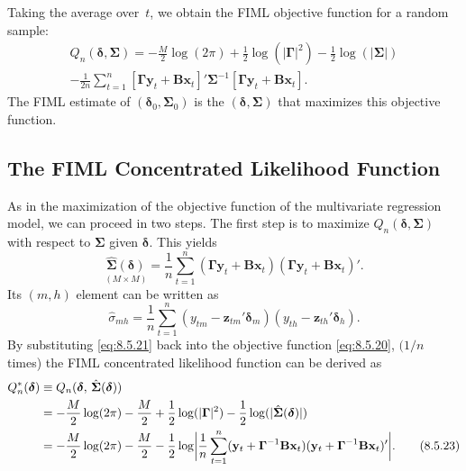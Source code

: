 Taking the average over~$t$, we obtain the FIML objective function for a random
sample:
\begin{multline}
  Q_n(\boldsymbol{\delta}, \boldsymbol{\Sigma})
  = -\frac{M}{2}\log(2\pi)
    + \frac{1}{2}\log(|\boldsymbol{\Gamma}|^2)
    - \frac{1}{2}\log(|\boldsymbol{\Sigma}|) \\
    - \frac{1}{2n}\sum_{t=1}^{n}
      [\boldsymbol{\Gamma}\mathbf{y}_t + \mathbf{B}\mathbf{x}_t]'
      \boldsymbol{\Sigma}^{-1}
      [\boldsymbol{\Gamma}\mathbf{y}_t + \mathbf{B}\mathbf{x}_t].
  \label{eq:8.5.20} \tag{8.5.20}
\end{multline}
The FIML estimate of $(\boldsymbol{\delta}_0, \boldsymbol{\Sigma}_0)$ is the $(\boldsymbol{\delta}, \boldsymbol{\Sigma})$ that maximizes this objective function.

\subsection*{The FIML Concentrated Likelihood Function}

As in the maximization of the objective function of the multivariate regression
model, we can proceed in two steps. The first step is to maximize
$Q_n(\boldsymbol{\delta}, \boldsymbol{\Sigma})$ with
respect to $\boldsymbol{\Sigma}$ given $\boldsymbol{\delta}$. This yields
\begin{equation}
  \underset{(M \times M)}{\hat{\boldsymbol{\Sigma}}(\boldsymbol{\delta})}
  = \frac{1}{n}\sum_{t=1}^{n}
    (\boldsymbol{\Gamma}\mathbf{y}_t + \mathbf{B}\mathbf{x}_t)
    (\boldsymbol{\Gamma}\mathbf{y}_t + \mathbf{B}\mathbf{x}_t)'.
  \label{eq:8.5.21} \tag{8.5.21}
\end{equation}
Its $(m, h)$ element can be written as
\begin{equation}
  \hat{\sigma}_{mh}
  = \frac{1}{n}\sum_{t=1}^{n}
    (y_{tm} - \mathbf{z}_{tm}'\boldsymbol{\delta}_m)
    (y_{th} - \mathbf{z}_{th}'\boldsymbol{\delta}_h).
  \label{eq:8.5.22} \tag{8.5.22}
\end{equation}
By substituting \eqref{eq:8.5.21} back into the objective function \eqref{eq:8.5.20},
$(1/n$ times) the
FIML concentrated likelihood function can be derived as
\begin{align}
  Q_n^*(\boldsymbol{\delta})
  &\equiv Q_n(\boldsymbol{\delta},\, \hat{\boldsymbol{\Sigma}}(\boldsymbol{\delta})) \notag \\
  &= -\frac{M}{2}\log(2\pi)
     - \frac{M}{2}
     + \frac{1}{2}\log(|\boldsymbol{\Gamma}|^2)
     - \frac{1}{2}\log(|\hat{\boldsymbol{\Sigma}}(\boldsymbol{\delta})|) \notag \\
  &= -\frac{M}{2}\log(2\pi)
     - \frac{M}{2}
     - \frac{1}{2}\log\biggl|\frac{1}{n}\sum_{t=1}^{n}
       (\mathbf{y}_t + \boldsymbol{\Gamma}^{-1}\mathbf{B}\mathbf{x}_t)
       (\mathbf{y}_t + \boldsymbol{\Gamma}^{-1}\mathbf{B}\mathbf{x}_t)'\biggr|.
  \label{eq:8.5.23} \tag{8.5.23}
\end{align}

